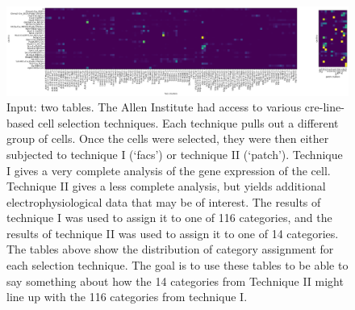 \begin{figure}
\begin{minipage}[c]{.3\textwidth}
\includegraphics[width=.9\textheight,angle=270]{pics/alleninput}
\end{minipage}
\hfill
\begin{minipage}[l]{.4\textwidth}
\caption{Input: two tables.  The Allen Institute had access to various cre-line-based cell selection techniques.  Each technique pulls out a different group of cells.  Once the cells were selected, they were then either subjected to technique I (`facs') or technique II (`patch').  Technique I gives a very complete analysis of the gene expression of the cell.  Technique II gives a less complete analysis, but yields additional electrophysiological data that may be of interest.  The results of technique I was used to assign it to one of 116 categories, and the results of technique II was used to assign it to one of 14 categories.  The tables above show the distribution of category assignment for each selection technique.  The goal is to use these tables to be able to say something about how the 14 categories from Technique II might line up with the 116 categories from technique I.  \label{fig:alleninput}}
\end{minipage}

\end{figure}

